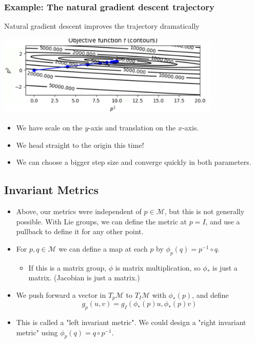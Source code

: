 \documentclass[10pt]{article}
\begin{document}
\subsubsection*{Example: The natural gradient descent trajectory}
Natural gradient descent improves the trajectory dramatically
\begin{center} 
	\includegraphics*[width=0.8\textwidth]{W8_7.png}
\end{center}
\begin{itemize}
	\item We have scale on the $y$-axis and translation on the $x$-axis.  
	\item We head straight to the origin this time!
	\item We can choose a bigger step size and converge quickly in both parameters.
\end{itemize}

\subsection*{Invariant Metrics}
\begin{itemize}
	\item Above, our metrics were independent of $p \in \mathcal{M}$, but this is not generally possible.  With Lie groups, we can define the metric at $p = I$, and use a pullback to define it for any other point.
	\item For $p, q \in \mathcal{M}$ we can define a map at each $p$ by $\phi_p (q) = p^{-1} \circ q$.
	\begin{itemize}
        \item If this is a matrix group, $\phi$ is matrix multiplication, so $\phi_*$ is just a matrix.  (Jacobian is just a matrix.)
    \end{itemize}
	\item We push forward a vector in $T_p \mathcal{M}$ to $T_I \mathcal{M}$ with $\phi_*(p)$, and define
    \[g_p(u, v) = g_I(\phi_*(p)u, \phi_* (p)v)\]
	\item This is called a "left invariant metric".  We could design a "right invariant metric" using $\phi_p(q) = q \circ p^{-1}$.
\end{itemize}
\end{document}
